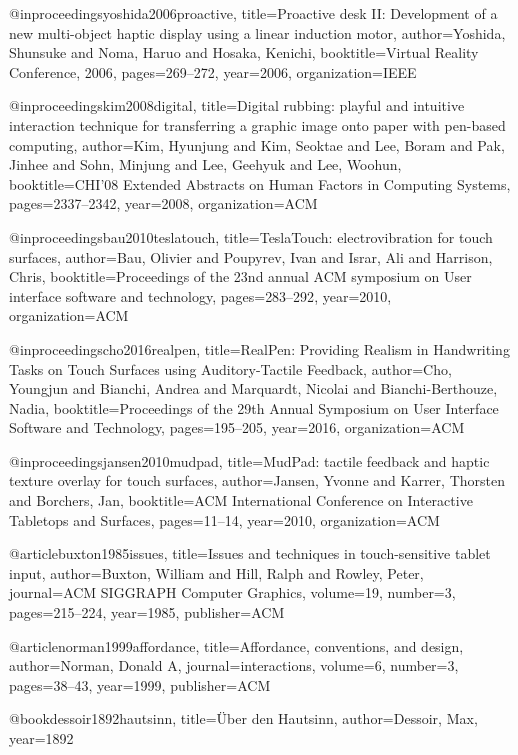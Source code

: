 @inproceedings{yoshida2006proactive,
  title={Proactive desk II: Development of a new multi-object haptic display using a linear induction motor},
  author={Yoshida, Shunsuke and Noma, Haruo and Hosaka, Kenichi},
  booktitle={Virtual Reality Conference, 2006},
  pages={269--272},
  year={2006},
  organization={IEEE}
}


@inproceedings{kim2008digital,
  title={Digital rubbing: playful and intuitive interaction technique for transferring a graphic image onto paper with pen-based computing},
  author={Kim, Hyunjung and Kim, Seoktae and Lee, Boram and Pak, Jinhee and Sohn, Minjung and Lee, Geehyuk and Lee, Woohun},
  booktitle={CHI'08 Extended Abstracts on Human Factors in Computing Systems},
  pages={2337--2342},
  year={2008},
  organization={ACM}
}

@inproceedings{bau2010teslatouch,
  title={TeslaTouch: electrovibration for touch surfaces},
  author={Bau, Olivier and Poupyrev, Ivan and Israr, Ali and Harrison, Chris},
  booktitle={Proceedings of the 23nd annual ACM symposium on User interface software and technology},
  pages={283--292},
  year={2010},
  organization={ACM}
}

@inproceedings{cho2016realpen,
  title={RealPen: Providing Realism in Handwriting Tasks on Touch Surfaces using Auditory-Tactile Feedback},
  author={Cho, Youngjun and Bianchi, Andrea and Marquardt, Nicolai and Bianchi-Berthouze, Nadia},
  booktitle={Proceedings of the 29th Annual Symposium on User Interface Software and Technology},
  pages={195--205},
  year={2016},
  organization={ACM}
}

@inproceedings{jansen2010mudpad,
  title={MudPad: tactile feedback and haptic texture overlay for touch surfaces},
  author={Jansen, Yvonne and Karrer, Thorsten and Borchers, Jan},
  booktitle={ACM International Conference on Interactive Tabletops and Surfaces},
  pages={11--14},
  year={2010},
  organization={ACM}
}

@article{buxton1985issues,
  title={Issues and techniques in touch-sensitive tablet input},
  author={Buxton, William and Hill, Ralph and Rowley, Peter},
  journal={ACM SIGGRAPH Computer Graphics},
  volume={19},
  number={3},
  pages={215--224},
  year={1985},
  publisher={ACM}
}

@article{norman1999affordance,
  title={Affordance, conventions, and design},
  author={Norman, Donald A},
  journal={interactions},
  volume={6},
  number={3},
  pages={38--43},
  year={1999},
  publisher={ACM}
}

@book{dessoir1892hautsinn,
  title={{\"U}ber den Hautsinn},
  author={Dessoir, Max},
  year={1892}
}

